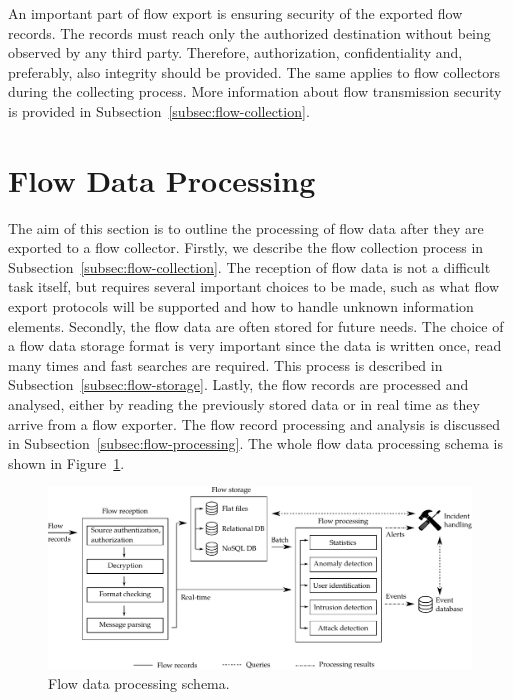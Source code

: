 An important part of flow export is ensuring security of the exported flow records. The records must reach only the authorized destination without being observed by any third party. Therefore, authorization, confidentiality and, preferably, also integrity should be provided. The same applies to flow collectors during the collecting process. More information about flow transmission security is provided in Subsection~\ref{subsec:flow-collection}.

\section{Flow Data Processing}

The aim of this section is to outline the processing of flow data after they are exported to a flow collector. Firstly, we describe the flow collection process in Subsection~\ref{subsec:flow-collection}. The reception of flow data is not a difficult task itself, but requires several important choices to be made, such as what flow export protocols will be supported and how to handle unknown information elements. Secondly, the flow data are often stored for future needs. The choice of a flow data storage format is very important since the data is written once, read many times and fast searches are required. This process is described in Subsection~\ref{subsec:flow-storage}. Lastly, the flow records are processed and analysed, either by reading the previously stored data or in real time as they arrive from a flow exporter. The flow record processing and analysis is discussed in Subsection~\ref{subsec:flow-processing}. The whole flow data processing schema is shown in Figure~\ref{fig:flow-processing-details}.

\begin{figure}
  \begin{center}
    \includegraphics[width=\textheight]{figures/flow-processing-details}
  \end{center}
  \caption{Flow data processing schema.}
  \label{fig:flow-processing-details}
\end{figure}

